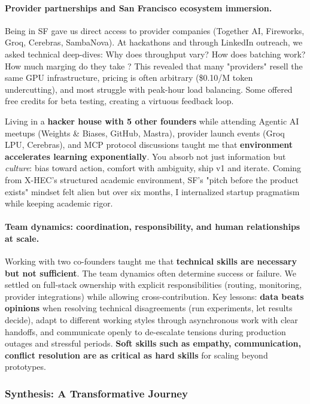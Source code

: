 \documentclass[english]{article}
\begin{document}
\paragraph{Provider partnerships and San Francisco ecosystem immersion.}

Being in SF gave us direct access to provider companies (Together AI, Fireworks, Groq, Cerebras, SambaNova). At hackathons and through LinkedIn outreach, we asked technical deep-dives: Why does throughput vary? How does batching work? How much marging do they take ? This revealed that many "providers" resell the same GPU infrastructure, pricing is often arbitrary (\$0.10/M token undercutting), and most struggle with peak-hour load balancing. Some offered free credits for beta testing, creating a virtuous feedback loop.

Living in a \textbf{hacker house with 5 other founders} while attending Agentic AI meetups (Weights \& Biases, GitHub, Mastra), provider launch events (Groq LPU, Cerebras), and MCP protocol discussions taught me that \textbf{environment accelerates learning exponentially}. You absorb not just information but \emph{culture}: bias toward action, comfort with ambiguity, ship v1 and iterate. Coming from X-HEC's structured academic environment, SF's "pitch before the product exists" mindset felt alien but over six months, I internalized startup pragmatism while keeping academic rigor.


\paragraph{Team dynamics: coordination, responsibility, and human relationships at scale.}

Working with two co-founders taught me that \textbf{technical skills are necessary but not sufficient}. The team dynamics often determine success or failure. We settled on full-stack ownership with explicit responsibilities (routing, monitoring, provider integrations) while allowing cross-contribution. Key lessons: \textbf{data beats opinions} when resolving technical disagreements (run experiments, let results decide), adapt to different working styles through asynchronous work with clear handoffs, and communicate openly to de-escalate tensions during production outages and stressful periods. \textbf{Soft skills such as empathy, communication, conflict resolution are as critical as hard skills} for scaling beyond prototypes.

\subsubsection{Synthesis: A Transformative Journey}
\end{document}
